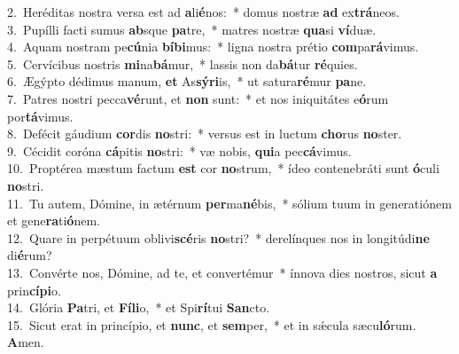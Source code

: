 {2.~}Heréditas nostra versa est ad \textbf{a}li\textbf{é}nos:~* domus nostræ \textbf{ad} ex\textbf{trá}neos.\\
{3.~}Pupílli facti sumus \textbf{ab}sque \textbf{pa}tre,~* matres nostræ \textbf{qua}si \textbf{ví}duæ.\\
{4.~}Aquam nostram pe\textbf{cú}nia \textbf{bí}\textbf{bi}mus:~* ligna nostra prétio \textbf{com}pa\textbf{rá}vimus.\\
{5.~}Cervícibus nostris \textbf{mi}na\textbf{bá}mur,~* lassis non da\textbf{bá}tur \textbf{ré}quies.\\
{6.~}Ægýpto dédimus manum, \textbf{et} As\textbf{sý}\textbf{ri}is,~* ut satura\textbf{ré}mur \textbf{pa}ne.\\
{7.~}Patres nostri pecca\textbf{vé}runt, et \textbf{non} sunt:~* et nos iniquitátes e\textbf{ó}rum por\textbf{tá}vimus.\\
{8.~}Defécit gáudium \textbf{cor}dis \textbf{no}stri:~* versus est in luctum \textbf{cho}rus \textbf{no}ster.\\
{9.~}Cécidit coróna \textbf{cá}pitis \textbf{no}stri:~* væ nobis, \textbf{qui}a pec\textbf{cá}vimus.\\
{10.~}Proptérea mæstum factum \textbf{est} cor \textbf{no}strum,~* ídeo contenebráti sunt \textbf{ó}culi \textbf{no}stri.\\
{11.~}Tu autem, Dómine, in ætérnum \textbf{per}ma\textbf{né}bis,~* sólium tuum in generatiónem et gene\textbf{ra}ti\textbf{ó}nem.\\
{12.~}Quare in perpétuum oblivi\textbf{scé}ris \textbf{no}stri?~* derelínques nos in longitúdi\textbf{ne} di\textbf{é}rum?\\
{13.~}Convérte nos, Dómine, ad te, et convertémur~* ínnova dies nostros, sicut \textbf{a} prin\textbf{cí}\textbf{pi}o.\\
{14.~}Glória \textbf{Pa}tri, et \textbf{Fí}\textbf{li}o,~* et Spi\textbf{rí}tui \textbf{San}cto.\\
{15.~}Sicut erat in princípio, et \textbf{nunc}, et \textbf{sem}per,~* et in sǽcula sæcu\textbf{ló}rum. \textbf{A}men.\\
